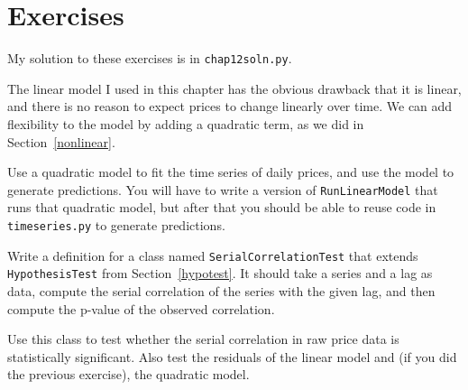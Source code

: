 \documentclass[12pt]{book}
\begin{document}
\section{Exercises}

My solution to these exercises is in \verb"chap12soln.py".

\begin{exercise}
The linear model I used in this chapter has the obvious drawback
that it is linear, and there is no reason to expect prices to
change linearly over time.
We can add flexibility to the model by adding a quadratic term,
as we did in Section~\ref{nonlinear}.  

Use a quadratic model to fit the time series of daily prices,
and use the model to generate predictions.  You will have to
write a version of \verb"RunLinearModel" that runs that quadratic
model, but after that you should be able to reuse code in
\verb"timeseries.py" to generate predictions.

\end{exercise}

\begin{exercise}
Write a definition for a class named \verb"SerialCorrelationTest"
that extends \verb"HypothesisTest" from Section~\ref{hypotest}.
It should take a series and a lag as data, compute the serial
correlation of the series with the given lag, and then compute
the p-value of the observed correlation.

Use this class to test whether the serial correlation in raw
price data is statistically significant.  Also test the residuals
of the linear model and (if you did the previous exercise),
the quadratic model.
   

\end{exercise}
\end{document}
